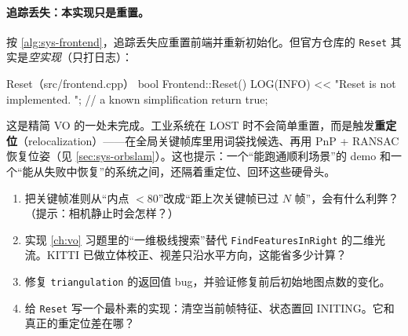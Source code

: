 
\paragraph{追踪丢失：本实现只是重置。}
按 \cref{alg:sys-frontend}，追踪丢失应重置前端并重新初始化。但官方仓库的 \texttt{Reset} 其实是\emph{空实现}（只打日志）：

\begin{codebox}[C++]{Reset（src/frontend.cpp）}
bool Frontend::Reset() {
    LOG(INFO) << "Reset is not implemented. ";     // a known simplification
    return true;
}
\end{codebox}

\noindent 这是精简 VO 的一处未完成。工业系统在 LOST 时不会简单重置，而是触发\textbf{重定位}（relocalization）——在全局关键帧库里用词袋找候选、再用 PnP + RANSAC 恢复位姿（见 \cref{sec:sys-orbslam}）。这也提示：一个“能跑通顺利场景”的 demo 和一个“能从失败中恢复”的系统之间，还隔着重定位、回环这些硬骨头。

\begin{practice}[练习]
\begin{enumerate}
  \item 把关键帧准则从“内点 $<80$”改成“距上次关键帧已过 $N$ 帧”，会有什么利弊？（提示：相机静止时会怎样？）
  \item 实现 \cref{ch:vo} 习题里的“一维极线搜索”替代 \texttt{FindFeaturesInRight} 的二维光流。KITTI 已做立体校正、视差只沿水平方向，这能省多少计算？
  \item 修复 \texttt{triangulation} 的返回值 bug，并验证修复前后初始地图点数的变化。
  \item 给 \texttt{Reset} 写一个最朴素的实现：清空当前帧特征、状态置回 INITING。它和真正的重定位差在哪？
\end{enumerate}
\end{practice}

